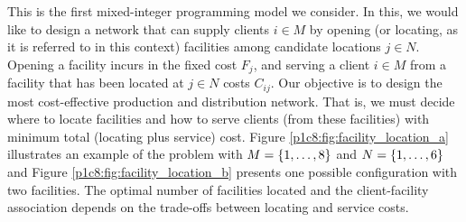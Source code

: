 This is the first mixed-integer programming model we consider. In this, we would like to design a network that can supply clients $i \in M$ by opening (or locating, as it is referred to in this context) facilities among candidate locations $j \in N$. Opening a facility incurs in the fixed cost $F_j$, and serving a client $i \in M$ from a facility that has been located at $j \in N$ costs $C_{ij}$. Our objective is to design the most cost-effective production and distribution network. That is, we must decide where to locate facilities and how to serve clients (from these facilities) with minimum total (locating plus service) cost. Figure \ref{p1c8:fig:facility_location_a} illustrates an example of the problem with $M = \left\{ 1,\dots,8 \right \}$ and $N = \left\{ 1,\dots,6 \right \}$ and Figure \ref{p1c8:fig:facility_location_b} presents one possible configuration with two facilities. The optimal number of facilities located and the client-facility association depends on the trade-offs between locating and service costs.	


